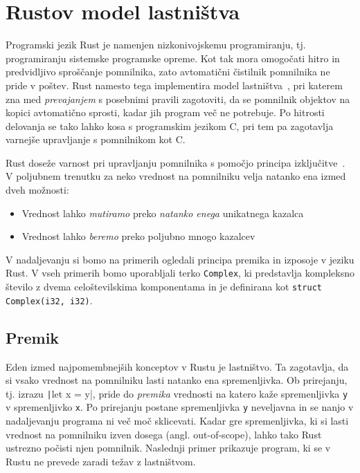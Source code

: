 \section{Rustov model lastništva}

Programski jezik Rust je namenjen nizkonivojskemu programiranju, tj. programiranju sistemske programske opreme. Kot tak mora omogočati hitro in predvidljivo sproščanje pomnilnika, zato avtomatični čistilnik pomnilnika ne pride v poštev. Rust namesto tega implementira model lastništva~\cite{klabnik2023rust}, pri katerem zna med \textit{prevajanjem} s posebnimi pravili zagotoviti, da se pomnilnik objektov na kopici avtomatično sprosti, kadar jih program več ne potrebuje. Po hitrosti delovanja se tako lahko kosa s programskim jezikom C, pri tem pa zagotavlja varnejše upravljanje s pomnilnikom kot C.

Rust doseže varnost pri upravljanju pomnilnika s pomočjo principa izključitve~\cite{Jung}. V poljubnem trenutku za neko vrednost na pomnilniku velja natanko ena izmed dveh možnosti:

\begin{itemize}
	\itemsep 0em
	\item Vrednost lahko \textit{mutiramo} preko \textit{natanko enega} unikatnega kazalca
	\item Vrednost lahko \textit{beremo} preko poljubno mnogo kazalcev
\end{itemize}

V nadaljevanju si bomo na primerih ogledali principa premika in izposoje v jeziku Rust. V vseh primerih bomo uporabljali terko \texttt{Complex}, ki predstavlja kompleksno število z dvema celoštevilskima komponentama in je definirana kot \texttt{struct Complex(i32, i32)}.

\subsection{Premik}

Eden izmed najpomembnejših konceptov v Rustu je lastništvo. Ta zagotavlja, da si vsako vrednost na pomnilniku lasti natanko ena spremenljivka. Ob prirejanju, tj. izrazu \texttt|let x = y|, pride do \textit{premika} vrednosti na katero kaže spremenljivka \texttt{y} v spremenljivko \texttt{x}. Po prirejanju postane spremenljivka \texttt{y} neveljavna in se nanjo v nadaljevanju programa ni več moč sklicevati. Kadar gre spremenljivka, ki si lasti vrednost na pomnilniku izven dosega (angl. out-of-scope), lahko tako Rust ustrezno počisti njen pomnilnik. Naslednji primer prikazuje program, ki se v Rustu ne prevede zaradi težav z lastništvom.

